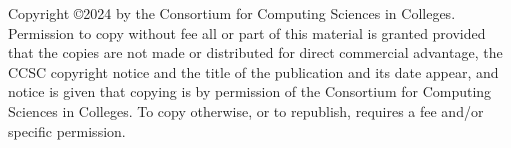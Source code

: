 Copyright \copyright 2024 by the Consortium for Computing Sciences in Colleges.
Permission to copy without fee all or part of this material is granted provided
that the copies are not made or distributed for direct commercial advantage,
the CCSC copyright notice and the title of the publication and its date appear,
and notice is given that copying is by permission of the Consortium for
Computing Sciences in Colleges.  To copy otherwise, or to republish, requires
a fee and/or specific permission.
